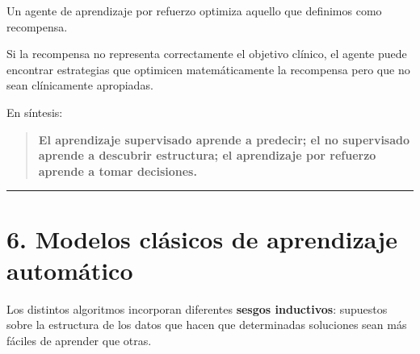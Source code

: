 \documentclass[
  letterpaper,
  DIV=11,
  numbers=noendperiod]{scrartcl}
\begin{document}
\begin{tcolorbox}[enhanced jigsaw, arc=.35mm, bottomrule=.15mm, bottomtitle=1mm, breakable, colback=white, colbacktitle=quarto-callout-warning-color!10!white, colframe=quarto-callout-warning-color-frame, coltitle=black, left=2mm, leftrule=.75mm, opacityback=0, opacitybacktitle=0.6, rightrule=.15mm, title=\textcolor{quarto-callout-warning-color}{\faExclamationTriangle}\hspace{0.5em}{La función de recompensa importa}, titlerule=0mm, toprule=.15mm, toptitle=1mm]

Un agente de aprendizaje por refuerzo optimiza aquello que definimos
como recompensa.

Si la recompensa no representa correctamente el objetivo clínico, el
agente puede encontrar estrategias que optimicen matemáticamente la
recompensa pero que no sean clínicamente apropiadas.

\end{tcolorbox}

En síntesis:

\begin{quote}
\textbf{El aprendizaje supervisado aprende a predecir; el no supervisado
aprende a descubrir estructura; el aprendizaje por refuerzo aprende a
tomar decisiones.}
\end{quote}

\begin{center}\rule{0.5\linewidth}{0.5pt}\end{center}

\section{6. Modelos clásicos de aprendizaje
automático}\label{modelos-cluxe1sicos-de-aprendizaje-automuxe1tico}

Los distintos algoritmos incorporan diferentes \textbf{sesgos
inductivos}: supuestos sobre la estructura de los datos que hacen que
determinadas soluciones sean más fáciles de aprender que otras.
\end{document}
